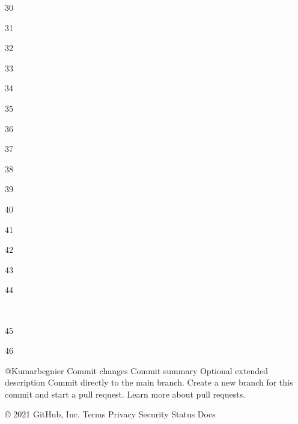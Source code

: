 \documentclass[journal,12pt,twocolumn]{IEEEtran}
\DeclareMathOperator*{\Res}{Res}
\renewcommand\thesection{\arabic{section}}
\renewcommand\thesubsection{\thesection.\arabic{subsection}}
\begin{document}
30

\usetikzlibrary{fadings}

31

\usepackage{listings}

32

    \usepackage{color}                                            %

33

    \usepackage{array}                                            %

34

    \usepackage{longtable}                                        %

35

    \usepackage{calc}                                             %

36

    \usepackage{multirow}                                         %

37

    \usepackage{hhline}                                           %

38

    \usepackage{ifthen}                                           %

39


40

    \usepackage{lscape}     

41

\usepackage{multicol}

42

\usepackage{chngcntr}

43

\DeclareMathOperator*{\Res}{Res}

44

​

45

\renewcommand\thesection{\arabic{section}}

46

\renewcommand\thesubsection{\thesection.\arabic{subsection}}

@Kumarbegnier
Commit changes
Commit summary
Optional extended description
Commit directly to the main branch.
Create a new branch for this commit and start a pull request. Learn more about pull requests.

    © 2021 GitHub, Inc.
    Terms
    Privacy
    Security
    Status
    Docs
\end{document}

